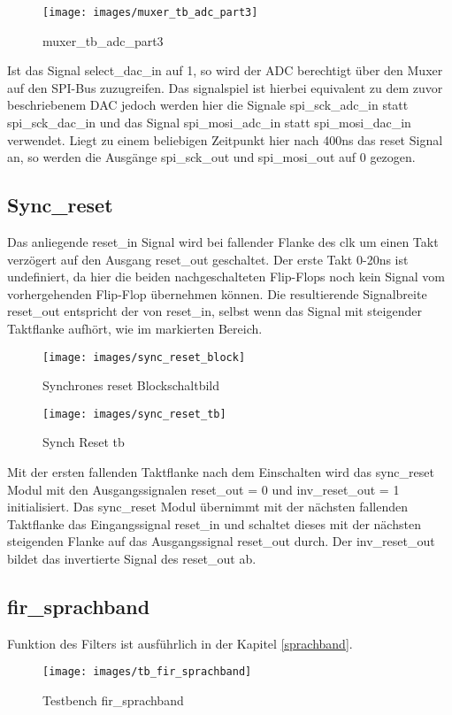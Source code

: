 \begin{figure}[H]
\centering
\texttt{[image: images/muxer\_tb\_adc\_part3]}
\caption{muxer\_tb\_adc\_part3}
\label{fig:muxer_tb_adc_part3}
\end{figure}

Ist das Signal select\_dac\_in auf 1, so wird der ADC berechtigt über den Muxer auf den SPI-Bus zuzugreifen.
Das signalspiel ist hierbei equivalent zu dem zuvor beschriebenem DAC jedoch werden hier die Signale spi\_sck\_adc\_in statt spi\_sck\_dac\_in und das Signal spi\_mosi\_adc\_in statt spi\_mosi\_dac\_in verwendet.
Liegt zu einem beliebigen Zeitpunkt hier nach 400ns das reset Signal an, so werden die Ausgänge spi\_sck\_out und spi\_mosi\_out auf 0 gezogen.


\subsection{Sync\_reset}
Das anliegende reset\_in Signal wird bei fallender Flanke des clk um einen Takt verzögert auf den Ausgang reset\_out geschaltet.
Der erste Takt 0-20ns ist undefiniert, da hier die beiden nachgeschalteten Flip-Flops noch kein Signal vom vorhergehenden Flip-Flop übernehmen können. Die resultierende Signalbreite reset\_out entspricht der von reset\_in, selbst wenn das Signal mit steigender Taktflanke aufhört, wie im markierten Bereich.

\begin{figure}[H]
\centering
\texttt{[image: images/sync\_reset\_block]}
\caption{Synchrones reset Blockschaltbild}
\label{fig:sync_reset_block}
\end{figure}

\begin{figure}[H]
\centering
\texttt{[image: images/sync\_reset\_tb]}
\caption{Synch Reset tb}
\label{fig:sync_reset_tb}
\end{figure}

Mit der ersten fallenden Taktflanke nach dem Einschalten wird das sync\_reset Modul mit den Ausgangssignalen reset\_out = 0 und inv\_reset\_out = 1 initialisiert.
Das sync\_reset Modul übernimmt mit der nächsten fallenden Taktflanke das Eingangssignal reset\_in und schaltet dieses mit der nächsten steigenden Flanke auf das Ausgangssignal reset\_out durch.
Der inv\_reset\_out bildet das invertierte Signal des reset\_out ab.

\subsection{fir\_sprachband}

Funktion des Filters ist ausführlich in der Kapitel  \ref{sprachband}.

\begin{figure}[H]
\centering
\texttt{[image: images/tb\_fir\_sprachband]}
\caption{Testbench fir\_sprachband}
\label{fig:tb_fir_sprachband}
\end{figure}





